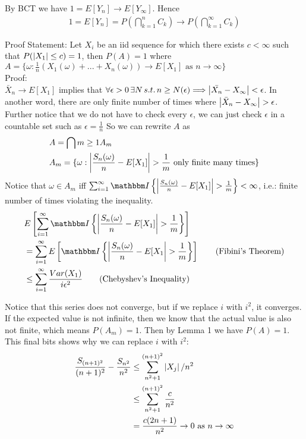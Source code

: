 By BCT we have $1 = E[Y_n] \to E[Y_\infty]$. Hence 
    \begin{align*}
        1 = E[Y_n] = P(\bigcap_{k=1}^n C_k) \to P(\bigcap_{k=1}^\infty C_k) 
    \end{align*}


Proof Statement: Let $X_i$ be an iid sequence for which there exists $c < \infty$ such that $P(\left| X_1 \right| \leq c) = 1$, then $P(A)=1$ where $A = \{ \omega : \frac{1}{n}(X_1(\omega) + ... + X_n(\omega)) \to E[X_1] \text{ as } n \to \infty \} $ \\

Proof: \\
$\bar{X}_n \to E[X_1]$ implies that $\forall \epsilon > 0 \, \exists N \, s.t. \, n \geq N(\epsilon) \Longrightarrow \left| \bar{X_n} - X_\infty \right| < \epsilon$. In another word, there are only finite number of times where $\left| \bar{X}_n - X_\infty \right| > \epsilon$. Further notice that we do not have to check every $\epsilon$, we can just check $\epsilon$ in a countable set such as $\epsilon = \frac{1}{n}$ So we can rewrite $A$ as 
    \begin{align*}
        & A = \bigcap{m \geq 1} A_m \\
        & A_m = \{ \omega : \left| \frac{S_n(\omega)}{n} - E[X_1] \right| > \frac{1}{m} \text{ only finite many times} \} 
    \end{align*}
Notice that $\omega \in A_m$ iff $\sum_{i=1}^\infty \indic{\abs{\frac{S_n(\omega)}{n} - E[X_1]}>\frac{1}{m}} < \infty$, i.e.: finite number of times violating the inequality. 
    \begin{align*}
        & E\left[\sum_{i=1}^\infty \indic{\abs{\frac{S_n(\omega)}{n} - E[X_1]}>\frac{1}{m}}\right]\\
        & =\sum_{i=1}^\infty E\left[\indic{\abs{\frac{S_n(\omega)}{n} - E[X_1}>\frac{1}{m}}\right] \tag{Fibini's Theorem}\\
        & \leq \sum_{i=1}^\infty \frac{Var(X_1)}{i \epsilon^2} \tag{Chebyshev's Inequality}
    \end{align*}
    
Notice that this series does not converge, but if we replace $i$ with $i^2$, it converges. If the expected value is not infinite, then we know that the actual value is also not finite, which means $P(A_m) = 1$. Then by Lemma 1 we have $P(A) = 1$. \\

This final bits shows why we can replace $i$ with $i^2$:
    \begin{align*}
        \frac{S_{(n+1)^2}}{(n+1)^2} - \frac{S_{n^2}}{n^2} 
        & \leq \sum_{n^2+1}^{(n+1)^2} \left| X_j \right|/ n^2 \\
        & \leq \sum_{n^2+1}^{(n+1)^2} \frac{c}{n^2} \\
        & = \frac{c (2n+1)}{n^2} \to 0 \text{ as $n \to \infty$}
    \end{align*}
    
